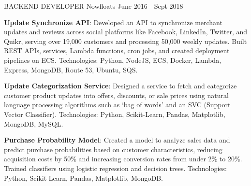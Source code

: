 \begin{cventries}
\vspace{2em} %
  \cventry
    {BACKEND DEVELOPER} %
    {Nowfloats} %
    {} %
    {June 2016 - Sept 2018} %
    {
      \begin{cvitems} %
        \item{\textbf{Update Synchronize API}: Developed an API to synchronize merchant updates and reviews across social platforms like Facebook, LinkedIn, Twitter, and Quikr, serving over 19,000 customers and processing 50,000 weekly updates. \newline Built REST APIs, services, Lambda functions, cron jobs, and created deployment pipelines on ECS. \newline Technologies: Python, NodeJS, ECS, Docker, Lambda, Express, MongoDB, Route 53, Ubuntu, SQS.}
        \item{\textbf{Update Categorization Service}: Designed a service to fetch and categorize customer product updates into offers, discounts, or sale prices using natural language processing algorithms such as ‘bag of words’ and an SVC (Support Vector Classifier). \newline Technologies: Python, Scikit-Learn, Pandas, Matplotlib, MongoDB, MySQL.}
        \item{\textbf{Purchase Probability Model}: Created a model to analyze sales data and predict purchase probabilities based on customer characteristics, reducing acquisition costs by 50\% and increasing conversion rates from under 2\% to 20\%. \newline Trained classifiers using logistic regression and decision trees. \newline Technologies: Python, Scikit-Learn, Pandas, Matplotlib, MongoDB.}
      \end{cvitems}
    }

\end{cventries}
